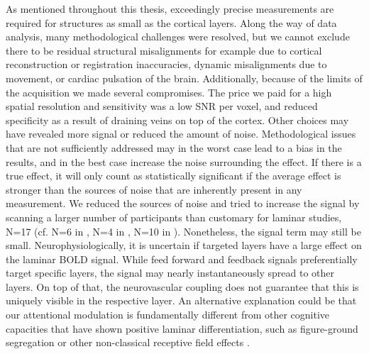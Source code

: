 As mentioned throughout this thesis, exceedingly precise measurements are required for structures as small as the cortical layers. Along the way of data analysis, many methodological challenges were resolved, but we cannot exclude there to be residual structural misalignments for example due to cortical reconstruction or registration inaccuracies, dynamic misalignments due to movement, or cardiac pulsation of the brain. Additionally, because of the limits of the acquisition we made several compromises. The price we paid for a high spatial resolution and sensitivity was a low SNR per voxel, and reduced specificity as a result of draining veins on top of the cortex. Other choices may have revealed more signal or reduced the amount of noise. Methodological issues that are not sufficiently addressed may in the worst case lead to a bias in the results, and in the best case increase the noise surrounding the effect. If there is a true effect, it will only count as statistically significant if the average effect is stronger than the sources of noise that are inherently present in any measurement. We reduced the sources of noise and tried to increase the signal by scanning a larger number of participants than customary for laminar studies, N=17 (cf. N=6 in \cite{Polimeni2010}, N=4 in \cite{Muckli2015}, N=10 in \cite{Kok2016}). Nonetheless, the signal term may still be small. Neurophysiologically, it is uncertain if targeted layers have a large effect on the laminar BOLD signal. While feed forward and feedback signals preferentially target specific layers, the signal may nearly instantaneously spread to other layers. On top of that, the neurovascular coupling does not guarantee that this is uniquely visible in the respective layer. An alternative explanation could be that our attentional modulation is fundamentally different from other cognitive capacities that have shown positive laminar differentiation, such as figure-ground segregation \cite{Kok2016} or other non-classical receptive field effects \cite{Muckli2015}.

